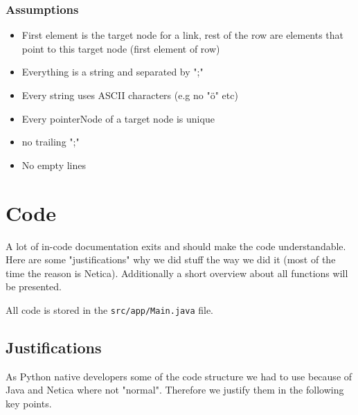 \documentclass[12pt]{scrartcl}
\begin{document}
\subsubsection{Assumptions}
\begin{itemize}
    \item First element is the target node for a link, rest of the row are elements that point to this target node (first element of row)
    \item Everything is a string and separated by ";"
    \item Every string uses ASCII characters (e.g no "ö" etc)
    \item Every pointerNode of a target node is unique
    \item no trailing ";"
    \item No empty lines
\end{itemize}


\section{Code}
\label{sec:code_doc}
A lot of in-code documentation exits and should make the code understandable. Here are some "justifications" why we did stuff the way we did it (most of the time the reason is Netica).
Additionally a short overview about all functions will be presented.

All code is stored in the \texttt{src/app/Main.java} file.

\subsection{Justifications}
As Python native developers some of the code structure we had to use because of Java and Netica where not "normal". Therefore we justify them in the following key points.
\end{document}
